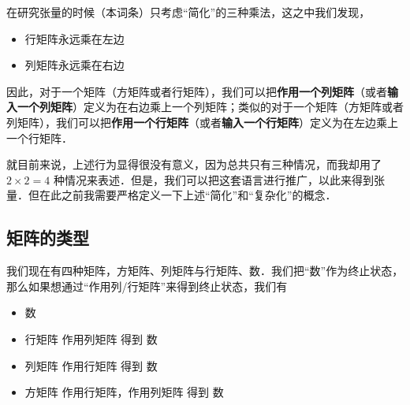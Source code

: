 在研究张量的时候（本词条）只考虑“简化”的三种乘法，这之中我们发现，
\begin{itemize}
\item 行矩阵永远乘在左边
\item 列矩阵永远乘在右边
\end{itemize}
因此，对于一个矩阵（方矩阵或者行矩阵），我们可以把\textbf{作用一个列矩阵}（或者\textbf{输入一个列矩阵}）定义为在右边乘上一个列矩阵；类似的对于一个矩阵（方矩阵或者列矩阵），我们可以把\textbf{作用一个行矩阵}（或者\textbf{输入一个行矩阵}）定义为在左边乘上一个行矩阵．

就目前来说，上述行为显得很没有意义，因为总共只有三种情况，而我却用了 $2 \times 2 = 4$ 种情况来表述．但是，我们可以把这套语言进行推广，以此来得到张量．但在此之前我需要严格定义一下上述“简化”和“复杂化”的概念．

\subsection{矩阵的类型}
我们现在有四种矩阵，方矩阵、列矩阵与行矩阵、数．我们把“数”作为终止状态，那么如果想通过“作用列/行矩阵”来得到终止状态，我们有
\begin{itemize}
\item 数
\item 行矩阵 作用列矩阵 得到 数
\item 列矩阵 作用行矩阵 得到 数
\item 方矩阵 作用行矩阵，作用列矩阵 得到 数
\end{itemize}








